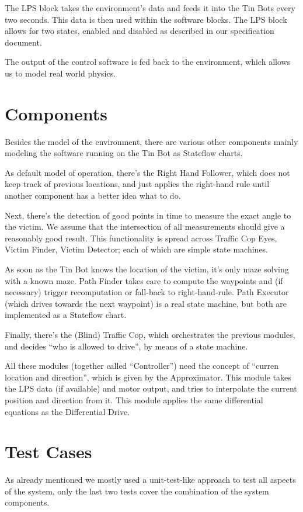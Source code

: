 \documentclass[a4paper,parskip,headheight=38pt]{scrartcl} %
\begin{document}
The LPS block takes the environment's data and feeds it into the Tin Bots every two seconds. This data is then used within the software blocks. The LPS block allows for two states, enabled and disabled as described in our specification document.

The output of the control software is fed back to the environment, which allows us to model real world physics.

\section{Components}
Besides the model of the environment, there are various other components mainly modeling the software running on the Tin Bot as Stateflow charts.

As default model of operation, there's the Right Hand Follower, which does not keep track of previous locations, and just applies the right-hand rule until another component has a better idea what to do.

Next, there's the detection of good points in time to measure the exact angle to the victim.  We assume that the intersection of all measurements should give a reasonably good result.  This functionality is spread across Traffic Cop Eyes, Victim Finder, Victim Detector; each of which are simple state machines.

As soon as the Tin Bot knows the location of the victim, it's only maze solving with a known maze.  Path Finder takes care to compute the waypoints and (if necessary) trigger recomputation or fall-back to right-hand-rule.  Path Executor (which drives towards the next waypoint) is a real state machine, but both are implemented as a Stateflow chart.

Finally, there's the (Blind) Traffic Cop, which orchestrates the previous modules, and decides \enquote{who is allowed to drive}, by means of a state machine.

All these modules (together called \enquote{Controller}) need the concept of \enquote{curren location and direction}, which is given by the Approximator.  This module takes the LPS data (if available) and motor output, and tries to interpolate the current position and direction from it.  This module applies the same differential equations as the Differential Drive.

\section{Test Cases}
As already mentioned we mostly used a unit-test-like approach to test all aspects of the system, only the last two tests cover the combination of the system components.
\end{document}
